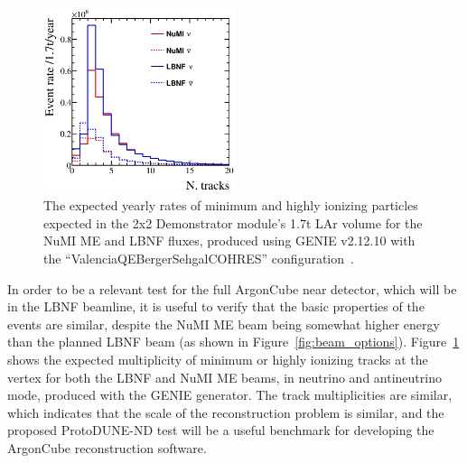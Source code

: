 \begin{figure}[htb]
  \centering
  \includegraphics[width=0.5\textwidth]{plots/2x2_ntracks_all.png}
  \caption{The expected yearly rates of minimum and highly ionizing particles expected in the 2x2 Demonstrator module's 1.7t LAr volume for the NuMI ME and LBNF fluxes, produced using GENIE v2.12.10 with the ``ValenciaQEBergerSehgalCOHRES'' configuration~\cite{genie}.}
  \label{fig:track_multiplicity}
\end{figure}
In order to be a relevant test for the full ArgonCube near detector, which will be in the LBNF beamline, it is useful to verify that the basic properties of the events are similar, despite the NuMI ME beam being somewhat higher energy than the planned LBNF beam (as shown in Figure~\ref{fig:beam_options}). Figure~\ref{fig:track_multiplicity} shows the expected multiplicity of minimum or highly ionizing tracks at the vertex for both the LBNF and NuMI ME beams, in neutrino and antineutrino mode, produced with the GENIE generator. The track multiplicities are similar, which indicates that the scale of the reconstruction problem is similar, and the proposed ProtoDUNE-ND test will be a useful benchmark for developing the ArgonCube reconstruction software.

